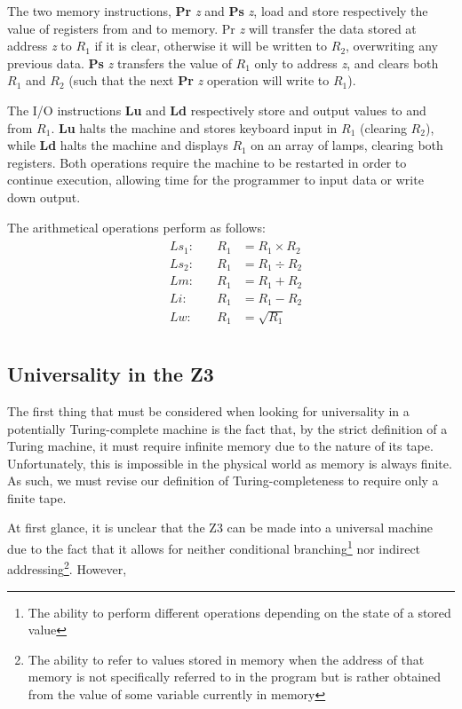 \documentclass[Master.tex]{subfiles}
\begin{document}
The two memory instructions, \textbf{Pr} \textit{z} and \textbf{Ps} \textit{z}, load and store respectively the value of registers from and to memory. Pr \textit{z} will transfer the data stored at address \textit{z} to $R_1$ if it is clear, otherwise it will be written to $R_2$, overwriting any previous data. \textbf{Ps} \textit{z} transfers the value of $R_1$ only to address \textit{z}, and clears both $R_1$ and $R_2$ (such that the next \textbf{Pr} \textit{z} operation will write to $R_1$). 

The I/O instructions \textbf{Lu} and \textbf{Ld} respectively store and output values to and from $R_1$. \textbf{Lu} halts the machine and stores keyboard input in $R_1$ (clearing $R_2$), while \textbf{Ld} halts the machine and displays $R_1$ on an array of lamps, clearing both registers. Both operations require the machine to be restarted in order to continue execution, allowing time for the programmer to input data or write down output.

The arithmetical operations perform as follows:
\begin{gather*}
\begin{aligned}
&Ls_1:\quad	&R_1 &= R_1 \times R_2 \\
&Ls_2:\quad	&R_1 &= R_1 \div R_2 \\
&Lm:\quad	&R_1 &= R_1 + R_2 \\
&Li:\quad	&R_1 &= R_1 - R_2 \\
&Lw:\quad	&R_1 &= \sqrt{R_1} \\
\end{aligned}
\end{gather*}

\subsection{Universality in the Z3}

The first thing that must be considered when looking for universality in a potentially Turing-complete machine is the fact that, by the strict definition of a Turing machine, it must require infinite memory due to the nature of its tape. Unfortunately, this is impossible in the physical world as memory is always finite. As such, we must revise our definition of Turing-completeness to require only a finite tape.

At first glance, it is unclear that the Z3 can be made into a universal machine due to the fact that it allows for neither conditional branching\footnote{The ability to perform different operations depending on the state of a stored value} nor indirect addressing\footnote{The ability to refer to values stored in memory when the address of that memory is not specifically referred to in the program but is rather obtained from the value of some variable currently in memory}. However, 
\end{document}
